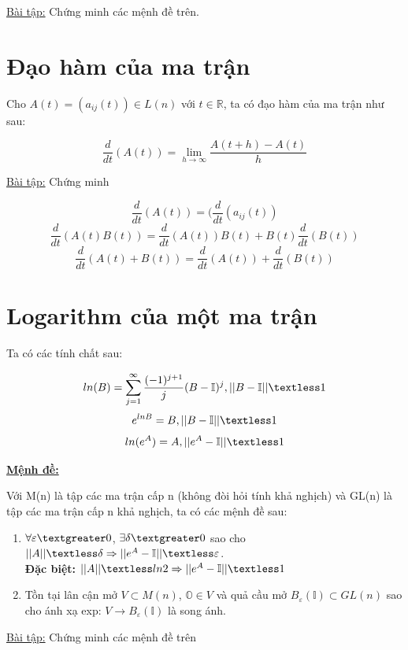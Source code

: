 \documentclass{report}
\begin{document}
\underline{Bài tập:} Chứng minh các mệnh đề trên.\\	

\section{Đạo hàm của ma trận}

Cho \( A(t) = (a_{ij}(t)) \in L(n) \) với \( t \in \mathbb{R} \), ta có đạo hàm của ma trận như sau:

\[ \frac{d}{dt}(A(t)) = \lim_{ h \to \infty } \frac{A(t+h) - A(t)}{h} \]

\underline{Bài tập:} Chứng minh

\[ \frac{d}{dt}(A(t)) = (\frac{d}{dt}(a_{ij}(t)) \] 
\[ \frac{d}{dt}(A(t)B(t)) = \frac{d}{dt}(A(t))B(t) + B(t)\frac{d}{dt}(B(t)) \]
\[ \frac{d}{dt}(A(t) + B(t)) = \frac{d}{dt}(A(t)) + \frac{d}{dt}(B(t)) \]

\section{Logarithm của một ma trận}

Ta có các tính chất sau:

\[ ln(B) = \sum_{j=1}^{ \infty } \frac{(-1)^{j+1}}{j}(B - \mathbb{I})^j, ||B - \mathbb{I}|| \textless 1 \]
\[ e^{lnB} = B, ||B - \mathbb{I}|| \textless 1 \]
\[ ln(e^{A}) = A, ||e^{A} - \mathbb{I}|| \textless 1 \]

\textbf{\underline{Mệnh đề:}}

Với M(n) là tập các ma trận cấp n (không đòi hỏi tính khả nghịch) và GL(n) là tập các ma trận cấp n khả nghịch, ta có các mệnh đề sau:

	\begin{enumerate}
		\item \( \forall \varepsilon \textgreater 0 \), \( \exists \delta \textgreater 0 \) sao cho \( ||A|| \textless \delta \Rightarrow || e^{A} - \mathbb{I} || \textless \varepsilon \).\\ \textbf{Đặc biệt:} \( ||A|| \textless ln2 \Rightarrow ||e^{A} - \mathbb{I} || \textless 1 \)
		\item Tồn tại lân cận mở \( V \subset M(n) \), \( \mathbb{O} \in V \) và quả cầu mở \( B_{\varepsilon}(\mathbb{I}) \subset GL(n) \) sao cho ánh xạ exp: \( V \rightarrow B_{\varepsilon}(\mathbb{I}) \) là song ánh.
	\end{enumerate}

\underline{Bài tập:} Chứng minh các mệnh đề trên
\end{document}

